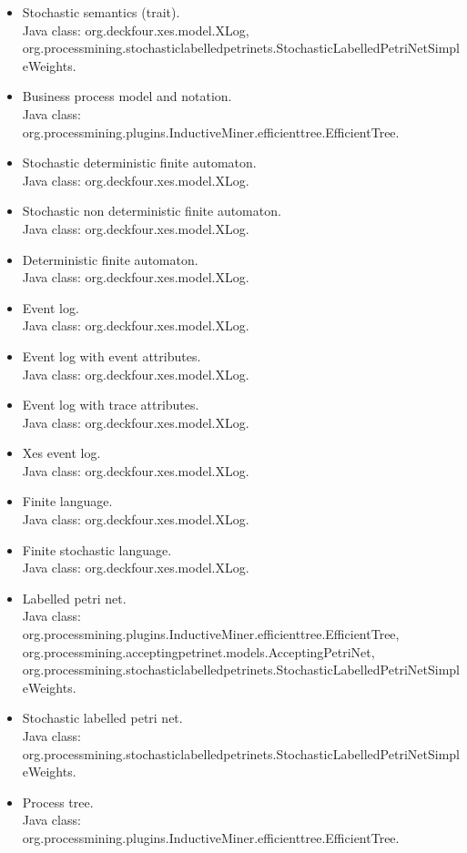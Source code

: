 {\begin{itemize}
\item Stochastic semantics (trait).\\Java class: org.deckfour.xes.model.XLog, org.processmining.stochasticlabelledpetrinets.StochasticLabelledPetriNetSimpleWeights.
\item Business process model and notation.\\Java class: org.processmining.plugins.InductiveMiner.efficienttree.EfficientTree.
\item Stochastic deterministic finite automaton.\\Java class: org.deckfour.xes.model.XLog.
\item Stochastic non deterministic finite automaton.\\Java class: org.deckfour.xes.model.XLog.
\item Deterministic finite automaton.\\Java class: org.deckfour.xes.model.XLog.
\item Event log.\\Java class: org.deckfour.xes.model.XLog.
\item Event log with event attributes.\\Java class: org.deckfour.xes.model.XLog.
\item Event log with trace attributes.\\Java class: org.deckfour.xes.model.XLog.
\item Xes event log.\\Java class: org.deckfour.xes.model.XLog.
\item Finite language.\\Java class: org.deckfour.xes.model.XLog.
\item Finite stochastic language.\\Java class: org.deckfour.xes.model.XLog.
\item Labelled petri net.\\Java class: org.processmining.plugins.InductiveMiner.efficienttree.EfficientTree, org.processmining.acceptingpetrinet.models.AcceptingPetriNet, org.processmining.stochasticlabelledpetrinets.StochasticLabelledPetriNetSimpleWeights.
\item Stochastic labelled petri net.\\Java class: org.processmining.stochasticlabelledpetrinets.StochasticLabelledPetriNetSimpleWeights.
\item Process tree.\\Java class: org.processmining.plugins.InductiveMiner.efficienttree.EfficientTree.

\end{itemize}}
